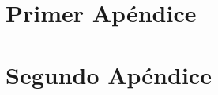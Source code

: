 \documentclass[5p,times,authoryear]{elsarticle}
\begin{document}






\appendix
\section{Primer Apéndice}    %

\section{Segundo Apéndice}
\end{document}

